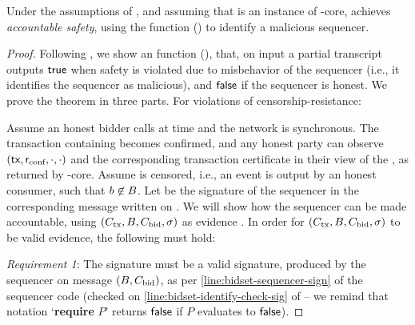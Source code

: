 \begin{lemma}\label{lem:bidset-accountability}
    Under the assumptions of , and assuming that \podInst is an instance of \podtm-core,  achieves \emph{accountable safety}, using the \identifySequencer{} function () to identify a malicious sequencer.
\end{lemma}
\begin{proof}
    Following , we show an \identifySequencer{\tran} function (), that, on input a partial transcript \tran outputs $\mathsf{true}$ when safety is violated due to misbehavior of the sequencer (i.e., it identifies the sequencer as malicious), and $\mathsf{false}$ if the sequencer is honest.
    We prove the theorem in three parts.
     For violations of censorship-resistance:

    \noindent
    Assume an honest bidder calls \opSubmitBid{\bid} at time \tzero and the network is synchronous.
    The transaction \tx containing \bid becomes confirmed, and any honest party can observe $(\textsf{tx}, \textsf{r}_\text{conf}, \cdot, \cdot)$ and the corresponding transaction certificate \txcert in their view of the \podtm, as returned by \podtm-core.
    Assume \bid is censored, i.e., an event \opResult{\bag, \bidcert} is output by an honest consumer, such that $b \not \in B$.
    Let \sig be the signature of the sequencer in the corresponding \msgbidresult{(\bag, \bidcert, \sigma)} message written on \podInst.
    We will show how the sequencer can be made accountable, using $(C_\text{tx}, B, C_\text{bid}, \sigma)$ as evidence \tran.
    In order for $(C_\text{tx}, B, C_\text{bid}, \sigma)$ to be valid evidence, the following must hold:

    \emph{Requirement 1}: The signature \sig must be a valid signature, produced by the sequencer on message $(B, C_\text{bid})$, as per \cref{line:bidset-sequencer-sign} of the sequencer code (checked on \cref{line:bidset-identify-check-sig} of  -- we remind that notation `\textbf{require} $P$' returns $\mathsf{false}$ if $P$ evaluates to $\mathsf{false}$).



\end{proof}

